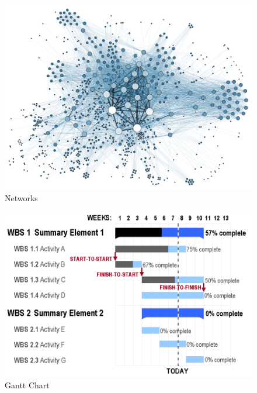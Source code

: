 \begin{figure}[ht]
      \includegraphics[width=\columnwidth]{images/Social_Network_Analysis_Visualization.png}
      \caption{Networks \cite{Viz}}
      \label{network}

\end{figure}

\begin{figure}[ht]
      \includegraphics[width=\columnwidth]{images/GanttChart.png}
      \caption{Gantt Chart \cite{Viz}}
      \label{gantt}
\end{figure}

